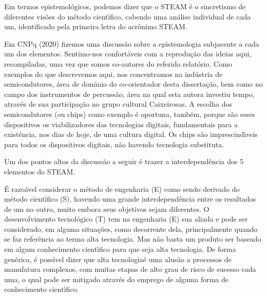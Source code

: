 \documentclass[
12pt,		%
openright,	%
twoside,  %
a4paper,			%
chapter=TITLE,		%
english,			%
french,				%
spanish,			%
brazil				%
]{USPSC-classe/USPSC}
\begin{document}
Em termos epistemol\'ogicos, podemos dizer que o STEAM \'e o sincretismo de diferentes vis\~oes do m\'etodo cient\'{\i}fico, cabendo uma an\'alise individual de cada um, identificado pela primeira letra do acr\^onimo STEAM.










Em  CNPq (2020) fizemos uma discuss\~ao sobre a epistemologia subjacente a cada um dos elementos. Sentimo-nos confort\'aveis com a reprodu\c{c}\~ao das ideias aqui, recompiladas, uma vez que somos co-autores do referido relat\'orio. Como exemplos do que descrevemos aqui, nos concentramos na ind\'ustria de semicondutores, \'area de dom\'{\i}nio do co-orientador desta disserta\c{c}\~ao, bem como no campo dos instrumentos de percuss\~ao, \'area na qual esta autora investiu tempo, atrav\'es de sua participa\c{c}\~ao no grupo cultural \textquotedbl Caixeirosas\textquotedbl . A escolha dos semicondutores (ou chips) como exemplo \'e oportuna, tamb\'em, porque s\~ao esses dispositivos os viabilizadores das tecnologias digitais, fundamentais para a exist\^encia, nos dias de hoje, de uma \textquotedbl cultura digital\textquotedbl . Os chips s\~ao imprescind\'{\i}veis para todos os dispositivos digitais, n\~ao havendo tecnologia substituta.










Um dos pontos altos da discuss\~ao a seguir \'e trazer a interdepend\^encia dos 5 elementos do STEAM.










\'E razo\'avel considerar o m\'etodo de engenharia (E) como sendo derivado do m\'etodo cient\'{\i}fico (S), havendo uma grande interdepend\^encia entre os resultados de um no outro, muito embora seus objetivos sejam diferentes. O desenvolvimento tecnol\'ogico (T) tem na engenharia (E) sua aliada e pode ser considerado, em alguma situa\c{c}\~oes, como decorrente dela, principalmente quando se faz refer\^encia ao termo \textquotedbl alta tecnologia\textquotedbl . Mas n\~ao basta um produto ser baseado em algum conhecimento cient\'{\i}fico para que seja alta tecnologia. De forma gen\'erica, \'e poss\'{\i}vel dizer que \textquotedbl alta tecnologia\textquotedbl  \'e uma alus\~ao a processos de manufatura complexos, com muitas etapas de alto grau de risco de sucesso cada uma, o qual pode ser mitigado atrav\'es do emprego de alguma forma de conhecimento cient\'{\i}fico.
\end{document}
